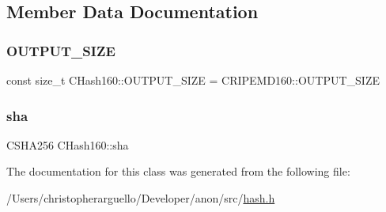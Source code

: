 \subsection{Member Data Documentation}
\mbox{\label{class_c_hash160_a1a5618e17d91ea96e86d779f575211eb}} 
\subsubsection{\texorpdfstring{O\+U\+T\+P\+U\+T\+\_\+\+S\+I\+ZE}{OUTPUT\_SIZE}}
{\footnotesize\ttfamily const size\+\_\+t C\+Hash160\+::\+O\+U\+T\+P\+U\+T\+\_\+\+S\+I\+ZE = C\+R\+I\+P\+E\+M\+D160\+::\+O\+U\+T\+P\+U\+T\+\_\+\+S\+I\+ZE\hspace{0.3cm}{\ttfamily [static]}}

\mbox{\label{class_c_hash160_a5b104e31076a06ece47c1134bbed0a81}} 
\subsubsection{\texorpdfstring{sha}{sha}}
{\footnotesize\ttfamily C\+S\+H\+A256 C\+Hash160\+::sha\hspace{0.3cm}{\ttfamily [private]}}



The documentation for this class was generated from the following file\+:\begin{DoxyCompactItemize}
\item 
/\+Users/christopherarguello/\+Developer/anon/src/\mbox{\hyperlink{hash_8h}{hash.\+h}}\end{DoxyCompactItemize}

